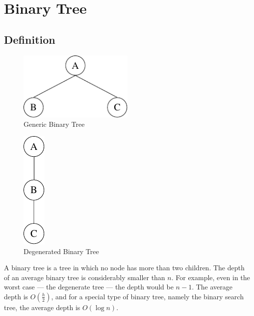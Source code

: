 \section{Binary Tree}
\subsection{Definition}
\begin{minipage}{0.5\textwidth}
  \begin{figure}[H]
    \centering
    \includegraphics[width=0.5\textwidth]{Figure/Generic-BT.pdf}
    \caption*{Generic Binary Tree}
  \end{figure}
\end{minipage}
\begin{minipage}{0.5\textwidth}
  \begin{figure}[H]
    \centering
    \includegraphics[height=0.3\textwidth]{Figure/Degene-BT.pdf}
    \caption*{Degenerated Binary Tree}
  \end{figure}
\end{minipage}

A binary tree is a tree in which no node has more than two children. The depth of an average binary tree is considerably smaller than \(n\). For example, even in the worst case — the degenerate tree — the depth would be \(n - 1\). The average depth is \(O(\frac{h}{2})\), and for a special type of binary tree, namely the binary search tree, the average depth is \(O(\log n)\).

